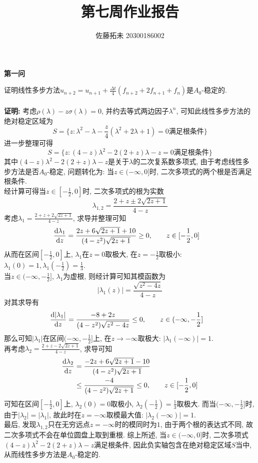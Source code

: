 \documentclass[12pt]{article}
\title{第七周作业报告}
\author{佐藤拓未 20300186002}
\date{}
\begin{document}
	
	\maketitle
	
	
	
	
	\begin{center}
		\textbf{第一问}
	\end{center}
	\noindent 证明线性多步方法$u_{n+2}=u_{n+1}+\frac{\Delta{t}}{4}(f_{n+2}+2f_{n+1}+f_n)$是$A_0$-稳定的.\\
	\quad \\
	\noindent \textbf{证明:} 考虑$\rho(\lambda)-z\sigma(\lambda)=0$, 并约去等式两边因子$\lambda^n$, 可知此线性多步方法的绝对稳定区域为$$S=\{z: \lambda^{2}-\lambda-\frac{z}{4}(\lambda^2+2\lambda+1) =0\text{满足根条件} \}$$
	\noindent 进一步整理可得$$S=\{z: (4-z)\lambda^2-2(2+z)\lambda-z=0\text{满足根条件}  \}$$
\noindent 其中$(4-z)\lambda^2-2(2+z)\lambda-z$是关于$\lambda$的二次复系数多项式, 由于考虑线性多步方法是否$A_0$-稳定, 问题转化为: 当$z \in (-\infty,0]$时, 二次多项式的两个根是否满足根条件. \\
经计算可得当$z \in [-\frac{1}{2},0]$时, 二次多项式的根为实数$$\lambda_{1,2}=\frac{2+z \pm 2\sqrt{2z+1} }{4-z}$$
\noindent 考虑$\lambda_1=\frac{2+z+2\sqrt{2z+1}}{4-z}$, 求导并整理可知
\begin{align*}
	\frac{{\rm d}\lambda_1}{{\rm d}z} &= \frac{2z+6\sqrt{2z+1}+10}{(4-z^2)\sqrt{2z+1}} \ge 0, \quad \quad z \in [-\frac{1}{2},0]
\end{align*}
\noindent 从而在区间$[-\frac{1}{2},0]$上, $\lambda_1$在$z=0$取极大, 在$z=-\frac{1}{2}$取极小: $\lambda_1(0)=1,\lambda_1(-\frac{1}{2})=\frac{1}{3}$.\\
当$z\in(-\infty,-\frac{1}{2}]$, $\lambda_1$为虚根, 则经计算可知其模函数为$$\vert \lambda_1(z) \vert=\frac{\sqrt{z^2-4z}}{4-z}$$
\noindent 对其求导有
\begin{align*}
	\frac{{\rm d}\vert \lambda_1\vert}{{\rm d}z} &= \frac{-8+2z}{(4-z^2)\sqrt{z^2-4z}} \le 0,\quad \quad z\in(-\infty,-\frac{1}{2}]
\end{align*}
\noindent 那么可知$\vert  \lambda_1\vert$在区间$(-\infty,-\frac{1}{2}]$上, 在$z\rightarrow -\infty$取极大: $\vert  \lambda_1(-\infty)\vert=1$. \\
再考虑$\lambda_2=\frac{2+z-2\sqrt{2z+1}}{4-z}$, 求导可知
\begin{align*}
	\frac{{\rm d}\lambda_2}{{\rm d}z} &= \frac{-2z+6\sqrt{2z+1}-10}{(4-z^2)\sqrt{2z+1}}\\
	&\le \frac{-4}{(4-z^2)\sqrt{2z+1}}\le0, \quad \quad z \in [-\frac{1}{2},0]
\end{align*}
\noindent 可知在区间$[-\frac{1}{2},0]$上, $\lambda_2(0)=0$取极小, $\lambda_2(-\frac{1}{2})=\frac{1}{3}$取极大. 而当$(-\infty,-\frac{1}{2}]$时, 由于$\vert \lambda_2\vert=\vert \lambda_1\vert$, 故此时在$z=-\infty$取模最大值: $\vert \lambda_2(-\infty)\vert=1$.\\
最后, 发现$\lambda_{1,2}$只在无穷远点$z=-\infty$时的模同时为$1$, 由于两个根的表达式不同, 故二次多项式不会在单位圆盘上取到重根.
综上所述, 当$z\in(-\infty,0]$时, 二次多项式$(4-z)\lambda^2-2(2+z)\lambda-z$满足根条件, 因此负实轴包含在绝对稳定区域$S$当中, 从而线性多步方法是$A_0$-稳定的.
	
\end{document}
